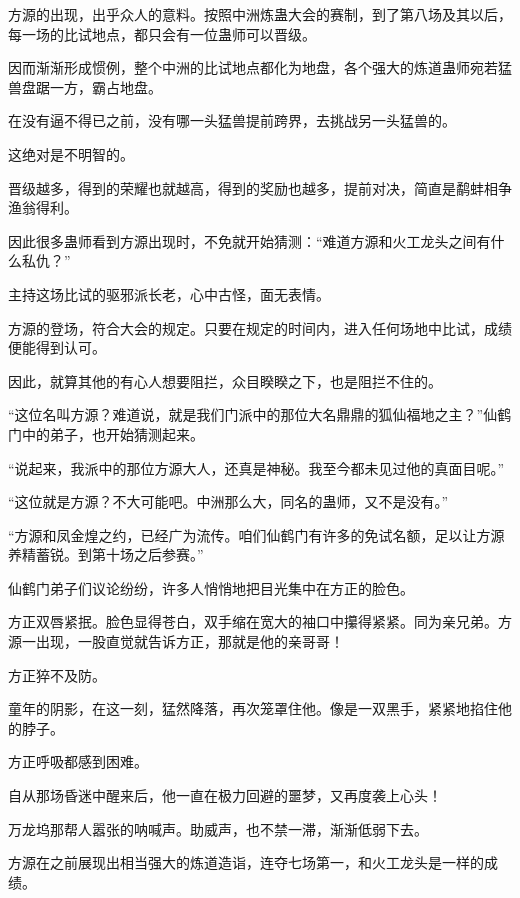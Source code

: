 
\begin{this_body}

方源的出现，出乎众人的意料。按照中洲炼蛊大会的赛制，到了第八场及其以后，每一场的比试地点，都只会有一位蛊师可以晋级。

因而渐渐形成惯例，整个中洲的比试地点都化为地盘，各个强大的炼道蛊师宛若猛兽盘踞一方，霸占地盘。

在没有逼不得已之前，没有哪一头猛兽提前跨界，去挑战另一头猛兽的。

这绝对是不明智的。

晋级越多，得到的荣耀也就越高，得到的奖励也越多，提前对决，简直是鹬蚌相争渔翁得利。

因此很多蛊师看到方源出现时，不免就开始猜测：“难道方源和火工龙头之间有什么私仇？”

主持这场比试的驱邪派长老，心中古怪，面无表情。

方源的登场，符合大会的规定。只要在规定的时间内，进入任何场地中比试，成绩便能得到认可。

因此，就算其他的有心人想要阻拦，众目睽睽之下，也是阻拦不住的。

“这位名叫方源？难道说，就是我们门派中的那位大名鼎鼎的狐仙福地之主？”仙鹤门中的弟子，也开始猜测起来。

“说起来，我派中的那位方源大人，还真是神秘。我至今都未见过他的真面目呢。”

“这位就是方源？不大可能吧。中洲那么大，同名的蛊师，又不是没有。”

“方源和凤金煌之约，已经广为流传。咱们仙鹤门有许多的免试名额，足以让方源养精蓄锐。到第十场之后参赛。”

仙鹤门弟子们议论纷纷，许多人悄悄地把目光集中在方正的脸色。

方正双唇紧抿。脸色显得苍白，双手缩在宽大的袖口中攥得紧紧。同为亲兄弟。方源一出现，一股直觉就告诉方正，那就是他的亲哥哥！

方正猝不及防。

童年的阴影，在这一刻，猛然降落，再次笼罩住他。像是一双黑手，紧紧地掐住他的脖子。

方正呼吸都感到困难。

自从那场昏迷中醒来后，他一直在极力回避的噩梦，又再度袭上心头！

万龙坞那帮人嚣张的呐喊声。助威声，也不禁一滞，渐渐低弱下去。

方源在之前展现出相当强大的炼道造诣，连夺七场第一，和火工龙头是一样的成绩。


\end{this_body}
